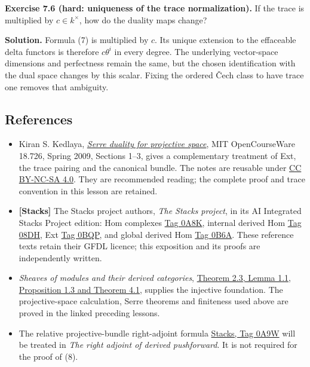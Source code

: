 \documentclass[11pt]{article}
\begin{document}
\textbf{Exercise 7.6 (hard: uniqueness of the trace normalization).} If
the trace is multiplied by \(c\in k^\times\), how do the duality maps
change?

\textbf{Solution.} Formula (7) is multiplied by \(c\). Its unique
extension to the effaceable delta functors is therefore \(c\theta^i\) in
every degree. The underlying vector-space dimensions and perfectness
remain the same, but the chosen identification with the dual space
changes by this scalar. Fixing the ordered Čech class to have trace one
removes that ambiguity.

\subsection{References}\label{references}

\begin{itemize}
\item
  Kiran S. Kedlaya,
  \href{https://ocw.mit.edu/courses/18-726-algebraic-geometry-spring-2009/resources/mit18_726s09_lec23_serre_dual_proj/}{\emph{Serre
  duality for projective space}}, MIT OpenCourseWare 18.726, Spring
  2009, Sections 1--3, gives a complementary treatment of Ext, the trace
  pairing and the canonical bundle. The notes are reusable under
  \href{https://ocw.mit.edu/pages/privacy-and-terms-of-use/}{CC BY-NC-SA
  4.0}. They are recommended reading; the complete proof and trace
  convention in this lesson are retained.
\item
  \textbf{{[}Stacks{]}} The Stacks project authors, \emph{The Stacks
  project}, in its AI Integrated Stacks Project edition: Hom complexes
  \href{https://kokunoyumeto.github.io/stacks-zh-hans-cn/en/cohomology.html\#cohomology-section-hom-complexes}{Tag
  0A8K}, internal derived Hom
  \href{https://kokunoyumeto.github.io/stacks-zh-hans-cn/en/cohomology.html\#cohomology-section-internal-hom}{Tag
  08DH}, Ext
  \href{https://kokunoyumeto.github.io/stacks-zh-hans-cn/en/cohomology.html\#cohomology-section-ext}{Tag
  0BQP}, and global derived Hom
  \href{https://kokunoyumeto.github.io/stacks-zh-hans-cn/en/cohomology.html\#cohomology-section-global-RHom}{Tag
  0B6A}. These reference texts retain their GFDL licence; this
  exposition and its proofs are independently written.
\item
  \emph{Sheaves of modules and their derived categories},
  \href{../derived-categories-and-sheaf-operations/injective-modules-and-bounded-below-derived-functors.html}{Theorem
  2.3, Lemma 1.1, Proposition 1.3 and Theorem 4.1}, supplies the
  injective foundation. The projective-space calculation, Serre theorems
  and finiteness used above are proved in the linked preceding lessons.
\item
  The relative projective-bundle right-adjoint formula
  \href{https://kokunoyumeto.github.io/stacks-zh-hans-cn/en/duality.html\#duality-lemma-upper-shriek-P1}{Stacks,
  Tag 0A9W} will be treated in \emph{The right adjoint of derived
  pushforward}. It is not required for the proof of (8).
\end{itemize}
\end{document}
